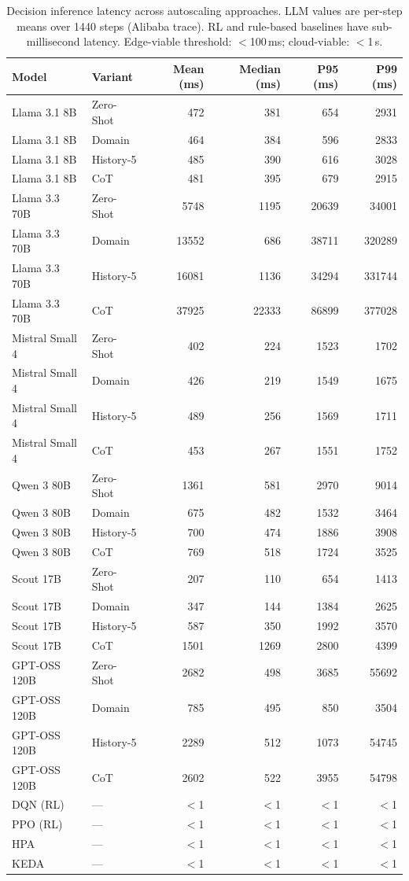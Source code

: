 \begin{table}[t]
\centering
\small
\caption{Decision inference latency across autoscaling approaches. LLM values are per-step means over 1440 steps (Alibaba trace). RL and rule-based baselines have sub-millisecond latency. Edge-viable threshold: $<$100\,ms; cloud-viable: $<$1\,s.}
\label{tab:inference-times}
\begin{tabular}{llrrrr}
\toprule
Model & Variant & Mean (ms) & Median (ms) & P95 (ms) & P99 (ms) \\
\midrule
Llama 3.1 8B & Zero-Shot & 472 & 381 & 654 & 2931 \\
Llama 3.1 8B & Domain & 464 & 384 & 596 & 2833 \\
Llama 3.1 8B & History-5 & 485 & 390 & 616 & 3028 \\
Llama 3.1 8B & CoT & 481 & 395 & 679 & 2915 \\
\midrule
Llama 3.3 70B & Zero-Shot & 5748 & 1195 & 20639 & 34001 \\
Llama 3.3 70B & Domain & 13552 & 686 & 38711 & 320289 \\
Llama 3.3 70B & History-5 & 16081 & 1136 & 34294 & 331744 \\
Llama 3.3 70B & CoT & 37925 & 22333 & 86899 & 377028 \\
\midrule
Mistral Small 4 & Zero-Shot & 402 & 224 & 1523 & 1702 \\
Mistral Small 4 & Domain & 426 & 219 & 1549 & 1675 \\
Mistral Small 4 & History-5 & 489 & 256 & 1569 & 1711 \\
Mistral Small 4 & CoT & 453 & 267 & 1551 & 1752 \\
\midrule
Qwen 3 80B & Zero-Shot & 1361 & 581 & 2970 & 9014 \\
Qwen 3 80B & Domain & 675 & 482 & 1532 & 3464 \\
Qwen 3 80B & History-5 & 700 & 474 & 1886 & 3908 \\
Qwen 3 80B & CoT & 769 & 518 & 1724 & 3525 \\
\midrule
Scout 17B & Zero-Shot & 207 & 110 & 654 & 1413 \\
Scout 17B & Domain & 347 & 144 & 1384 & 2625 \\
Scout 17B & History-5 & 587 & 350 & 1992 & 3570 \\
Scout 17B & CoT & 1501 & 1269 & 2800 & 4399 \\
\midrule
GPT-OSS 120B & Zero-Shot & 2682 & 498 & 3685 & 55692 \\
GPT-OSS 120B & Domain & 785 & 495 & 850 & 3504 \\
GPT-OSS 120B & History-5 & 2289 & 512 & 1073 & 54745 \\
GPT-OSS 120B & CoT & 2602 & 522 & 3955 & 54798 \\
\midrule
DQN (RL) & --- & $<$1 & $<$1 & $<$1 & $<$1 \\
PPO (RL) & --- & $<$1 & $<$1 & $<$1 & $<$1 \\
HPA & --- & $<$1 & $<$1 & $<$1 & $<$1 \\
KEDA & --- & $<$1 & $<$1 & $<$1 & $<$1 \\
\bottomrule
\end{tabular}
\end{table}
